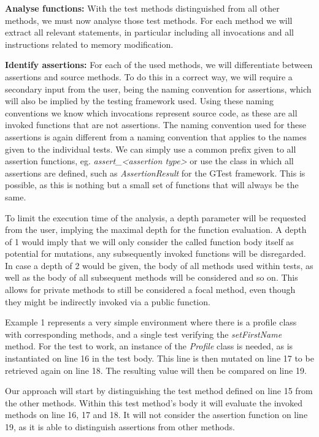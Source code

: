 \documentclass[11pt]{article}
\begin{document}
\begin{multicols}{2}
\noindent
\textbf{Analyse functions: }With the test methods distinguished from all other methods, we must now analyse those test methods. For each method we will extract all relevant statements, in particular including all invocations and all instructions related to memory modification. 

\noindent
\textbf{Identify assertions: }For each of the used methods, we will differentiate between assertions and source methods. To do this in a correct way, we will require a secondary input from the user, being the naming convention for assertions, which will also be implied by the testing framework used. Using these naming conventions we know which invocations represent source code, as these are all invoked functions that are not assertions. The naming convention used for these assertions is again different from a naming convention that applies to the names given to the individual tests. We can simply use a common prefix given to all assertion functions, eg. \textit{assert\_\textless assertion type\textgreater} or use the class in which all assertions are defined, such as \textit{AssertionResult} for the GTest framework. This is possible, as this is nothing but a small set of functions that will always be the same.

To limit the execution time of the analysis, a depth parameter will be requested from the user, implying the maximal depth for the function evaluation. A depth of 1 would imply that we will only consider the called function body itself as potential for mutations, any subsequently invoked functions will be disregarded. In case a depth of 2 would be given, the body of all methods used within tests, as well as the body of all subsequent methods will be considered and so on. This allows for private methods to still be considered a focal method, even though they might be indirectly invoked via a public function.

Example 1 represents a very simple environment where there is a profile class with corresponding methods, and a single test verifying the \textit{setFirstName} method. For the test to work, an instance of the \textit{Profile} class is needed, as is instantiated on line 16 in the test body. This line is then mutated on line 17 to be retrieved again on line 18. The resulting value will then be compared on line 19. 

Our approach will start by distinguishing the test method defined on line 15 from the other methods. Within this test method's body it will evaluate the invoked methods on line 16, 17 and 18. It will not consider the assertion function on line 19, as it is able to distinguish assertions from other methods.


\end{multicols}
\end{document}
